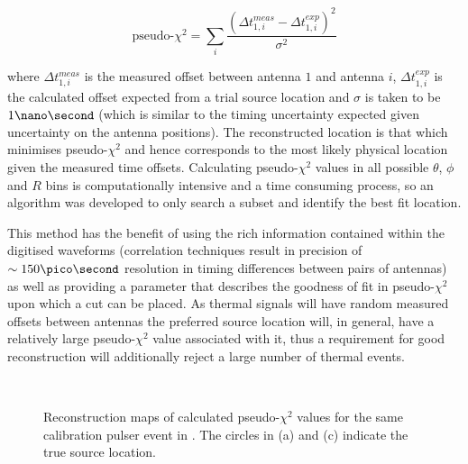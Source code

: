\begin{equation}
  \mbox{pseudo-}\chi^{2} = \sum_{i} \frac{(\Delta t_{1,i}^{meas} - \Delta t_{1,i}^{exp})^{2}}{\sigma^{2}}
  \label{eq:analysis:Reconstruction:ChiSq}
\end{equation}


\noindent  where $\Delta t_{1,i}^{meas}$ is the measured offset between antenna $1$ and antenna $i$, $\Delta t_{1,i}^{exp}$ is the calculated offset expected from a trial source location and $\sigma$ is taken to be $1 \nano \second$ (which is similar to the timing uncertainty expected given uncertainty on the antenna positions). The reconstructed location is that which minimises pseudo-$\chi^{2}$ and hence corresponds to the most likely physical location given the measured time offsets. Calculating pseudo-$\chi^{2}$ values in all possible $\theta$, $\phi$ and $R$ bins is computationally intensive and a time consuming process, so an algorithm was developed to only search a subset and identify the best fit location.


 This method has the benefit of using the rich information contained within the digitised waveforms (correlation techniques result in precision of $\sim 150 \pico \second$ resolution in timing differences between pairs of antennas) as well as providing a parameter that describes the goodness of fit in pseudo-$\chi^2$ upon which a cut can be placed. As thermal signals will have random measured offsets between antennas the preferred source location will, in general, have a relatively large pseudo-$\chi^2$ value associated with it, thus a requirement for good reconstruction will additionally reject a large number of thermal events.

\begin{figure}[htpb]
  \hfill
  \\
  \caption{Reconstruction maps of calculated pseudo-$\chi^{2}$ values for the same calibration pulser event in . The circles in (a) and (c) indicate the true source location.}
  \label{fig:analysis:Reconstruction:CSW-ChiSq-Example}
\end{figure}

